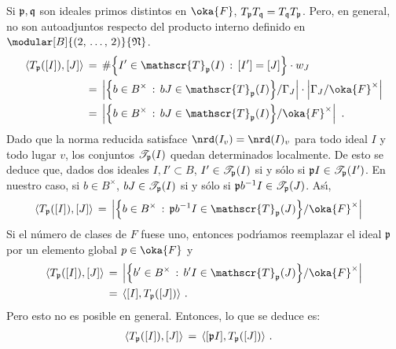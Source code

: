 Si $\frak{p},\frak{q}$ son ideales primos distintos en $\oka{F}$,
$T_{\frak{p}}T_{\frak{q}}=T_{\frak{q}}T_{\frak{p}}$. Pero, en general, no son
autoadjuntos respecto del producto interno definido en
$\modular[B]{(2,\,\dots,\,2)}{\frak{N}}$.
\begin{align*}
	\langle T_{\frak{p}}([I]),[J]\rangle & \,=\,
		\#\Big\{ I'\in\mathscr{T}_{\frak{p}}(I)\,:\,
			[I']=[J]\Big\}\cdot w_{J} \\
	& \,=\,\left|\Big\{ b\in B^{\times}\,:\,
		bJ\in\mathscr{T}_{\frak{p}}(I)\Big\}/\Gamma_{J}\right|\cdot
		\left|\Gamma_{J}/\oka{F}^{\times}\right| \\
	& \,=\, \left|\Big\{ b\in B^{\times}\,:\,bJ\in
		\mathscr{T}_{\frak{p}}(I)\Big\}/\oka{F}^{\times}\right|
	\text{ .}
\end{align*}
%
Dado que la norma reducida satisface $\nrd(I_{v})=\nrd(I)_{v}$ para todo ideal
$I$ y todo lugar $v$, los conjuntos $\mathscr{T}_{\frak{p}}(I)$ quedan
determinados localmente. De esto se deduce que, dados dos ideales
$I,I'\subset B$, $I'\in\mathscr{T}_{\frak{p}}(I)$ si y s\'{o}lo si
$\frak{p}I\in\mathscr{T}_{\frak{p}}(I')$. En nuestro caso, si
$b\in B^{\times}$, $bJ\in\mathscr{T}_{\frak{p}}(I)$ si y s\'{o}lo si
$\frak{p}b^{-1}I\in\mathscr{T}_{\frak{p}}(J)$. As\'{\i},
\begin{align*}
	\langle T_{\frak{p}}([I]),[J]\rangle & \,=\,
		\left|\Big\{ b\in B^{\times}\,:\,
			\frak{p}b^{-1}I\in\mathscr{T}_{\frak{p}}(J)\Big\}/
			\oka{F}^{\times}\right|
\end{align*}
%
Si el n\'{u}mero de clases de $F$ fuese uno, entonces podr\'{\i}amos reemplazar
el ideal $\frak{p}$ por un elemento global $p\in\oka{F}$ y
\begin{align*}
	\langle T_{\frak{p}}([I]),[J]\rangle & \,=\,
	\left|\Big\{ b'\in B^{\times}\,:\,b'I\in
		\mathscr{T}_{\frak{p}}(J)\Big\}/\oka{F}^{\times}\right| \\
	& \,=\, \langle [I],T_{\frak{p}}([J])\rangle
	\text{ .}
\end{align*}
%
Pero esto no es posible en general. Entonces, lo que se deduce es:
\begin{align*}
	\langle T_{\frak{p}}([I]),[J]\rangle & \,=\,
		\langle [\frak{p}I],T_{\frak{p}}([J])\rangle
	\text{ .}
\end{align*}
%

